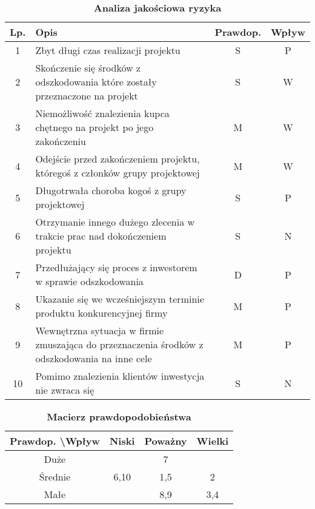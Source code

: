\begin{table}[htb]
\centering
\begin{tabular}{|c|p{11.5cm}|c|c|} 
\hline Lp. & Opis & Prawdop. & Wpływ \\
\hline 1 & Zbyt długi czas realizacji projektu & S & P \\
\hline 2 & Skończenie się środków z odszkodowania które zostały przeznaczone na projekt & S & W \\
\hline 3 & Niemożliwość znalezienia kupca chętnego na projekt po jego zakończeniu & M & W \\
\hline 4 & Odejście przed zakończeniem projektu, któregoś z członków grupy projektowej & M & W \\
\hline5 & Długotrwała choroba kogoś z grupy projektowej & S & P \\
\hline6 & Otrzymanie innego dużego zlecenia w trakcie prac nad dokończeniem projektu & S & N \\
\hline7 & Przedłużający się proces z inwestorem w sprawie odszkodowania & D & P \\
\hline8 & Ukazanie się we wcześniejszym terminie produktu konkurencyjnej firmy & M & P \\
\hline9 & Wewnętrzna sytuacja w firmie zmuszająca do przeznaczenia środków z odszkodowania na inne cele  & M & P  \\
\hline10 & Pomimo znalezienia klientów inwestycja nie zwraca się &  S & N  \\
\hline
\end{tabular}
\caption{\textbf{Analiza jakościowa ryzyka}}
\label{tab:analizaJakosciowa}
\end{table}

\clearpage

\begin{table}[!h]
\centering
\begin{tabular}{|c|c|c|c|} \hline Prawdop. \textbackslash Wpływ & Niski & Poważny & Wielki \\
 \hline Duże &  & 7 &  \\
\hline Średnie & 6,10 & 1,5 & 2 \\
\hline Małe &  & 8,9  & 3,4  \\
\hline
\end{tabular}
\caption{\textbf{Macierz prawdopodobieństwa}}
\label{tab:macierzPrawdopodobienstwa}
\end{table}






